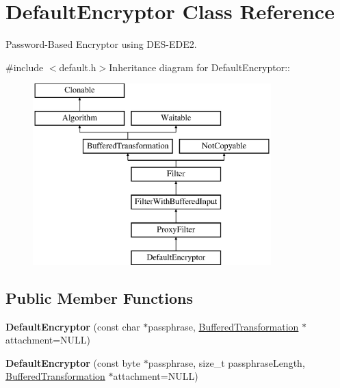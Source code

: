 \hypertarget{class_default_encryptor}{
\section{DefaultEncryptor Class Reference}
\label{class_default_encryptor}
}


Password-\/Based Encryptor using DES-\/EDE2.  


{\ttfamily \#include $<$default.h$>$}Inheritance diagram for DefaultEncryptor::\begin{figure}[H]
\begin{center}
\leavevmode
\includegraphics[height=7cm]{class_default_encryptor}
\end{center}
\end{figure}
\subsection*{Public Member Functions}
\begin{DoxyCompactItemize}
\item 
\hypertarget{class_default_encryptor_a351c407758faa27a7fc50c2d49d9b439}{
{\bfseries DefaultEncryptor} (const char $\ast$passphrase, \hyperlink{class_buffered_transformation}{BufferedTransformation} $\ast$attachment=NULL)}
\label{class_default_encryptor_a351c407758faa27a7fc50c2d49d9b439}

\item 
\hypertarget{class_default_encryptor_aa2bfc09437b2ec346ab013ed6afda830}{
{\bfseries DefaultEncryptor} (const byte $\ast$passphrase, size\_\-t passphraseLength, \hyperlink{class_buffered_transformation}{BufferedTransformation} $\ast$attachment=NULL)}
\label{class_default_encryptor_aa2bfc09437b2ec346ab013ed6afda830}

\end{DoxyCompactItemize}
